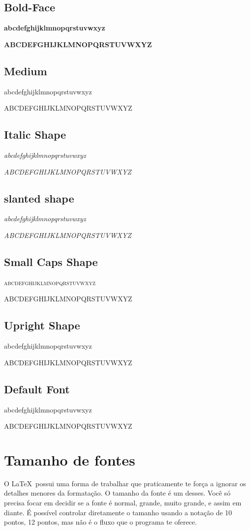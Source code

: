 \subsection{Bold-Face}
\textbf{abcdefghijklmnopqrstuvwxyz}

\textbf{ABCDEFGHIJKLMNOPQRSTUVWXYZ}

\subsection{Medium}
\textmd{abcdefghijklmnopqrstuvwxyz}

\textmd{ABCDEFGHIJKLMNOPQRSTUVWXYZ}

\subsection{Italic Shape}
\textit{abcdefghijklmnopqrstuvwxyz}

\textit{ABCDEFGHIJKLMNOPQRSTUVWXYZ}

\subsection{slanted shape}
\textsl{abcdefghijklmnopqrstuvwxyz}

\textsl{ABCDEFGHIJKLMNOPQRSTUVWXYZ}

\subsection{Small Caps Shape}
\textsc{abcdefghijklmnopqrstuvwxyz}

\textsc{ABCDEFGHIJKLMNOPQRSTUVWXYZ}

\subsection{Upright Shape}
\textup{abcdefghijklmnopqrstuvwxyz}

\textup{ABCDEFGHIJKLMNOPQRSTUVWXYZ}

\subsection{Default Font}
\textnormal{abcdefghijklmnopqrstuvwxyz}

\textnormal{ABCDEFGHIJKLMNOPQRSTUVWXYZ}

\section{Tamanho de fontes}
O \LaTeX\ possui uma forma de trabalhar que praticamente te força a ignorar os detalhes menores da formatação.
O tamanho da fonte é um desses.
Você só precisa focar em decidir se a fonte é normal, grande, muito grande, e assim em diante.
É possível controlar diretamente o tamanho usando a notação de 10 pontos, 12 pontos, mas não é o fluxo que o programa te oferece.

